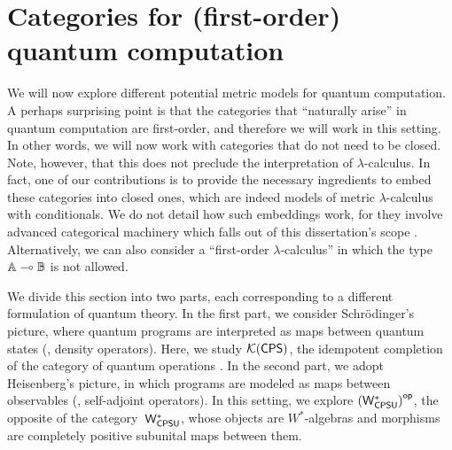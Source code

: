 \section{Categories for (first-order) quantum computation} \label{sec:quantum_cats}
We will now explore different potential metric models for quantum computation.
A perhaps surprising point is that the categories that ``naturally arise'' in quantum computation are first-order, and therefore we will work in this setting. In other words, we will now work with categories that do not need to be closed. Note, however, that this does not preclude the interpretation of $\lambda$-calculus. In fact, one of our contributions is to provide the necessary ingredients to embed these categories into closed ones, which are indeed models of metric $\lambda$-calculus with conditionals. We do not detail how such embeddings work, for they involve advanced categorical machinery which falls out of this dissertation's scope \cite{borceuxHandbookCategoricalAlgebra1994}. Alternatively, we can also consider a ``first-order $\lambda$-calculus'' in which the type $\mathbb{A} \multimap \mathbb{B}$ is not allowed.




We divide this section into two parts, each corresponding to a different formulation of quantum theory. In the first part, we consider Schr\"odinger's picture, where quantum programs are interpreted as maps between quantum states (\ie, density operators). Here, we study $\mathcal{K}{(\mathsf{CPS})}$, the idempotent completion of the category of quantum operations  .
In the second part, we adopt Heisenberg's picture, in which programs are modeled as maps between observables (\ie, self-adjoint operators). In this setting, we explore $\left(\mathsf{W^*_{CPSU}}\right)^{\mathsf{op}}$, the opposite of the category~$\mathsf{W^*_{CPSU}}$, whose objects are \( W^* \)-algebras and morphisms are completely positive subunital maps between them. 


